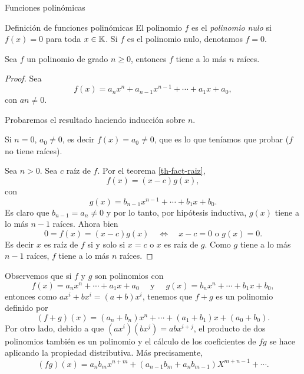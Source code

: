 \begin{chapter}{Funciones polinómicas}
\begin{section}{Definición de funciones polinómicas}
  El polinomio $f$ es el \textit{polinomio nulo} si $f(x)=0$ para toda $x \in \mathbb K$. Si $f$ es el polinomio nulo,  denotamos $f =0$.

  \begin{teorema}\label{th-pol-raiz}
      Sea $f$ un polinomio de grado $n \ge 0$, entonces $f$ tiene a lo  más  $n$ raíces.
  \end{teorema}
  \begin{proof}
      Sea
      \begin{equation*}
          f(x) = a_nx^n + a_{n-1}x^{n-1}+\cdots + a_1x +a_0,
      \end{equation*}
      con $an \ne 0$.

      Probaremos el resultado haciendo inducción sobre $n$.

      Si $n=0$, $a_0 \ne 0$, es decir  $f(x)=a_0\ne 0$, que es lo que teníamos que probar ($f$ no tiene raíces).


      Sea $n>0$. Sea $c$ raíz de $f$. Por  el teorema \ref{th-fact-raiz},
      \begin{equation*}
          f(x) = (x-c)g(x),
      \end{equation*}
      con
      \begin{equation*}
          g(x) = b_{n-1}x^{n-1} + \cdots + b_1x +b_0.
      \end{equation*}
      Es claro que $b_{n-1} = a_n \ne 0$ y por lo tanto, por hipótesis inductiva, $g(x)$ tiene a lo más $n-1$ raíces. Ahora bien
      \begin{equation*}
          0 =f(x) = (x-c)g(x) \quad \Leftrightarrow \quad x-c=0 \text{ o } g(x) =0.
      \end{equation*}
      Es decir $x$ es raíz de $f$ si y solo si $x=c$ o $x$ es raíz de $g$. Como $g$ tiene a lo más $n-1$ raíces,  $f$ tiene a lo más $n$ raíces.
  \end{proof}

  Observemos que si $f$ y $g$ son polinomios con
  \begin{equation*}
      f(x) = a_nx^n + \cdots + a_1x +a_0 \quad\text{ y } \quad g(x) = b_nx^n +\cdots + b_1x +b_0,
  \end{equation*}
  entonces como $ax^i + b x^i = (a+b)x^i$, tenemos que $f+g$ es un polinomio definido por
  \begin{equation*}
      (f + g)(x) = (a_n+b_n)x^n + \cdots + (a_1+b_1)x +(a_0+b_0).
  \end{equation*}
  Por otro  lado,  debido  a que $(ax^i)(bx^j) = abx^{i+j}$, el producto de dos polinomios también es un polinomio y el cálculo de los coeficientes de $fg$  se hace aplicando la propiedad distributiva. Más precisamente,
  \begin{equation*}
      (fg)(x) = a_nb_m x^{n+m} + (a_{n-1}b_m + a_nb_{m-1})X^{m+n-1} + \cdots.
  \end{equation*}



\end{section}
\end{chapter}
